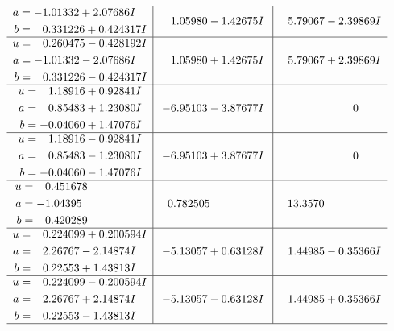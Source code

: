 \documentclass[1p]{elsarticle_modified}
\theoremstyle{definition}
\begin{document}
$$\begin{array}{c|c|c}
\begin{aligned}
a &= -1.01332 + 2.07686 I \\
b &= \phantom{-}0.331226 + 0.424317 I\end{aligned}
 & \phantom{-}1.05980 - 1.42675 I & \phantom{-}5.79067 - 2.39869 I \\ \hline\begin{aligned}
u &= \phantom{-}0.260475 - 0.428192 I \\
a &= -1.01332 - 2.07686 I \\
b &= \phantom{-}0.331226 - 0.424317 I\end{aligned}
 & \phantom{-}1.05980 + 1.42675 I & \phantom{-}5.79067 + 2.39869 I \\ \hline\begin{aligned}
u &= \phantom{-}1.18916 + 0.92841 I \\
a &= \phantom{-}0.85483 + 1.23080 I \\
b &= -0.04060 + 1.47076 I\end{aligned}
 & -6.95103 - 3.87677 I & \phantom{-0.000000 } 0 \\ \hline\begin{aligned}
u &= \phantom{-}1.18916 - 0.92841 I \\
a &= \phantom{-}0.85483 - 1.23080 I \\
b &= -0.04060 - 1.47076 I\end{aligned}
 & -6.95103 + 3.87677 I & \phantom{-0.000000 } 0 \\ \hline\begin{aligned}
u &= \phantom{-}0.451678\phantom{ +0.000000I} \\
a &= -1.04395\phantom{ +0.000000I} \\
b &= \phantom{-}0.420289\phantom{ +0.000000I}\end{aligned}
 & \phantom{-}0.782505\phantom{ +0.000000I} & \phantom{-}13.3570\phantom{ +0.000000I} \\ \hline\begin{aligned}
u &= \phantom{-}0.224099 + 0.200594 I \\
a &= \phantom{-}2.26767 - 2.14874 I \\
b &= \phantom{-}0.22553 + 1.43813 I\end{aligned}
 & -5.13057 + 0.63128 I & \phantom{-}1.44985 - 0.35366 I \\ \hline\begin{aligned}
u &= \phantom{-}0.224099 - 0.200594 I \\
a &= \phantom{-}2.26767 + 2.14874 I \\
b &= \phantom{-}0.22553 - 1.43813 I\end{aligned}
 & -5.13057 - 0.63128 I & \phantom{-}1.44985 + 0.35366 I\\
 \hline 
 \end{array}$$\newpage
\end{document}
